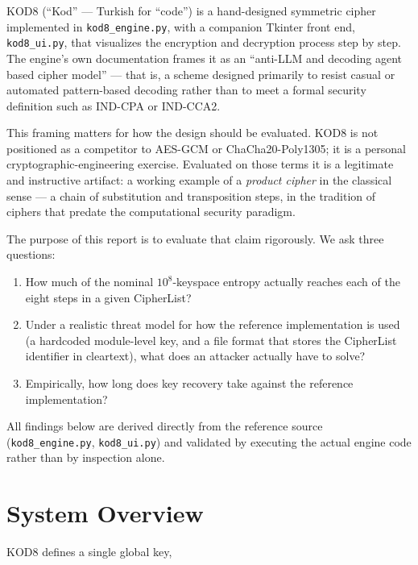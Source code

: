 \documentclass[11pt]{article}
\begin{document}
KOD8 (``Kod'' — Turkish for ``code'') is a hand-designed symmetric cipher
implemented in \texttt{kod8\_engine.py}, with a companion Tkinter
front end, \texttt{kod8\_ui.py}, that visualizes the encryption and
decryption process step by step. The engine's own documentation frames it
as an ``anti-LLM and decoding agent based cipher model'' — that is, a
scheme designed primarily to resist casual or automated pattern-based
decoding rather than to meet a formal security definition such as
IND-CPA or IND-CCA2.

This framing matters for how the design should be evaluated. KOD8 is not
positioned as a competitor to AES-GCM or ChaCha20-Poly1305; it is a
personal cryptographic-engineering exercise. Evaluated on those terms it
is a legitimate and instructive artifact: a working example of a
\emph{product cipher} in the classical sense — a chain of substitution and
transposition steps, in the tradition of ciphers that predate the
computational security paradigm.

The purpose of this report is to evaluate that claim rigorously. We ask
three questions:

\begin{enumerate}[leftmargin=1.6em]
  \item How much of the nominal $10^{8}$-key\-space entropy actually
        reaches each of the eight steps in a given CipherList?
  \item Under a realistic threat model for how the reference
        implementation is used (a hardcoded module-level key, and a file
        format that stores the CipherList identifier in cleartext), what
        does an attacker actually have to solve?
  \item Empirically, how long does key recovery take against the
        reference implementation?
\end{enumerate}

All findings below are derived directly from the reference source
(\texttt{kod8\_engine.py}, \texttt{kod8\_ui.py}) and validated by
executing the actual engine code rather than by inspection alone.

\section{System Overview}

KOD8 defines a single global key,
\end{document}
